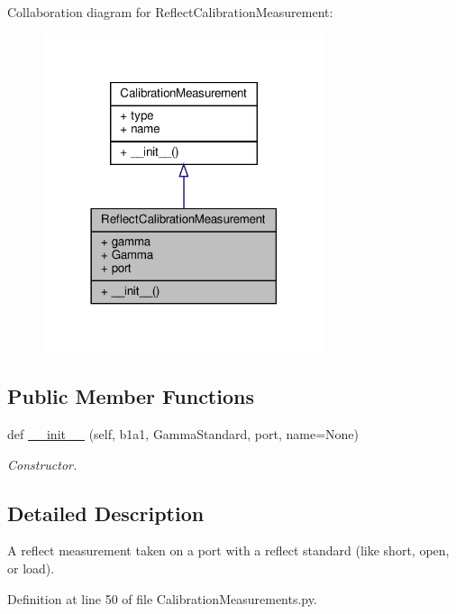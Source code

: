 Collaboration diagram for Reflect\+Calibration\+Measurement\+:
\nopagebreak
\begin{figure}[H]
\begin{center}
\leavevmode
\includegraphics[width=234pt]{classSignalIntegrity_1_1Measurement_1_1Calibration_1_1CalibrationMeasurements_1_1ReflectCalibrationMeasurement__coll__graph}
\end{center}
\end{figure}
\subsection*{Public Member Functions}
\begin{DoxyCompactItemize}
\item 
def \hyperlink{classSignalIntegrity_1_1Measurement_1_1Calibration_1_1CalibrationMeasurements_1_1ReflectCalibrationMeasurement_ac27eb7fe360b81f719eaa4870978bde1}{\+\_\+\+\_\+init\+\_\+\+\_\+} (self, b1a1, Gamma\+Standard, port, name=None)
\begin{DoxyCompactList}\small\item\em Constructor. \end{DoxyCompactList}\end{DoxyCompactItemize}


\subsection{Detailed Description}
A reflect measurement taken on a port with a reflect standard (like short, open, or load). 



Definition at line 50 of file Calibration\+Measurements.\+py.



